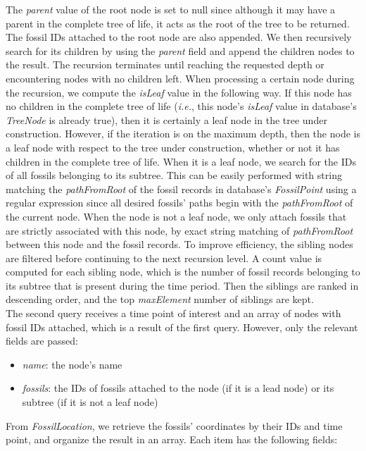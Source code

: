 \documentclass[11pt, a4paper,oneside,chapterprefix=false]{scrbook}
\begin{document}
The \emph{parent} value of the root node is set to null since although it may have a parent in the complete tree of life, it acts as the root of the tree to be returned. The fossil IDs attached to the root node are also appended. We then recursively search for its children by using the \emph{parent} field and append the children nodes to the result. The recursion terminates until reaching the requested depth or encountering nodes with no children left. When processing a certain node during the recursion, we compute the \emph{isLeaf} value in the following way. If this node has no children in the complete tree of life (\emph{i.e.}, this node's \emph{isLeaf} value in database's \emph{TreeNode} is already true), then it is certainly a leaf node in the tree under construction. However, if the iteration is on the maximum depth, then the node is a leaf node with respect to the tree under construction, whether or not it has children in the complete tree of life. When it is a leaf node, we search for the IDs of all fossils belonging to its subtree. This can be easily performed with string matching the \emph{pathFromRoot} of the fossil records in database's \emph{FossilPoint} using a regular expression since all desired fossils' paths begin with the \emph{pathFromRoot} of the current node. When the node is not a leaf node, we only attach fossils that are strictly associated with this node, by exact string matching of \emph{pathFromRoot} between this node and the fossil records. To improve efficiency, the sibling nodes are filtered before continuing to the next recursion level. A count value is computed for each sibling node, which is the number of fossil records belonging to its subtree that is present during the time period. Then the siblings are ranked in descending order, and the top \emph{maxElement} number of siblings are kept. \\

The second query receives a time point of interest and an array of nodes with fossil IDs attached, which is a result of the first query. However, only the relevant fields are passed: 
\begin{itemize}
	\item \textit{name}: the node's name
	\item \textit{fossils}: the IDs of fossils attached to the node (if it is a lead node) or its subtree (if it is not a leaf node)
\end{itemize}

From \emph{FossilLocation}, we retrieve the fossils' coordinates by their IDs and time point, and organize the result in an array. Each item has the following fields:
\end{document}
